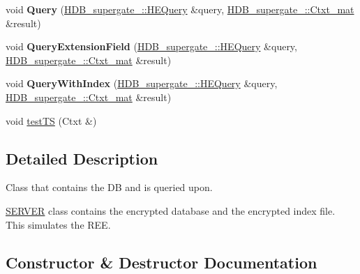 \begin{DoxyCompactItemize}
\item 
\mbox{\label{classHDB__supergate__server___1_1SERVER_a531add9c79f48572fa08f0461abffd8d}} 
void {\bfseries Query} (\hyperlink{classHDB__supergate___1_1HEQuery}{H\+D\+B\+\_\+supergate\+\_\+\+::\+H\+E\+Query} \&query, \hyperlink{namespaceHDB__supergate___a46a3fb2b98c95dc7615203376c4ad0c8}{H\+D\+B\+\_\+supergate\+\_\+\+::\+Ctxt\+\_\+mat} \&result)
\item 
\mbox{\label{classHDB__supergate__server___1_1SERVER_a188dcd9aa9335e639516b32b01d67ce4}} 
void {\bfseries Query\+Extension\+Field} (\hyperlink{classHDB__supergate___1_1HEQuery}{H\+D\+B\+\_\+supergate\+\_\+\+::\+H\+E\+Query} \&query, \hyperlink{namespaceHDB__supergate___a46a3fb2b98c95dc7615203376c4ad0c8}{H\+D\+B\+\_\+supergate\+\_\+\+::\+Ctxt\+\_\+mat} \&result)
\item 
\mbox{\label{classHDB__supergate__server___1_1SERVER_ae404dee7ba0db1e12420edecbab2ba55}} 
void {\bfseries Query\+With\+Index} (\hyperlink{classHDB__supergate___1_1HEQuery}{H\+D\+B\+\_\+supergate\+\_\+\+::\+H\+E\+Query} \&query, \hyperlink{namespaceHDB__supergate___a46a3fb2b98c95dc7615203376c4ad0c8}{H\+D\+B\+\_\+supergate\+\_\+\+::\+Ctxt\+\_\+mat} \&result)
\item 
void \hyperlink{classHDB__supergate__server___1_1SERVER_a4b6051325021088c25ad409b302cef55}{test\+TS} (Ctxt \&)
\end{DoxyCompactItemize}


\subsection{Detailed Description}
Class that contains the DB and is queried upon. 

\hyperlink{classHDB__supergate__server___1_1SERVER}{S\+E\+R\+V\+ER} class contains the encrypted database and the encrypted index file. This simulates the R\+EE. 

\subsection{Constructor \& Destructor Documentation}
\mbox{\label{classHDB__supergate__server___1_1SERVER_ab8168d1e8d3ee76b908eca8422cf97e5}} 
